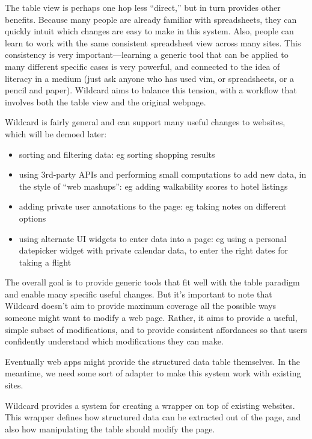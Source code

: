 \documentclass[english,submission]{programming}
\begin{document}
The table view is perhaps one hop less ``direct,'' but in turn provides
other benefits. Because many people are already familiar with
spreadsheets, they can quickly intuit which changes are easy to make in
this system. Also, people can learn to work with the same consistent
spreadsheet view across many sites. This consistency is very
important---learning a generic tool that can be applied to many
different specific cases is very powerful, and connected to the idea of
literacy in a medium (just ask anyone who has used vim, or spreadsheets,
or a pencil and paper). Wildcard aims to balance this tension, with a
workflow that involves both the table view and the original webpage.

Wildcard is fairly general and can support many useful changes to
websites, which will be demoed later:

\begin{itemize}
\tightlist
\item
  sorting and filtering data: eg sorting shopping results
\item
  using 3rd-party APIs and performing small computations to add new
  data, in the style of ``web mashups'': eg adding walkability scores to
  hotel listings
\item
  adding private user annotations to the page: eg taking notes on
  different options
\item
  using alternate UI widgets to enter data into a page: eg using a
  personal datepicker widget with private calendar data, to enter the
  right dates for taking a flight
\end{itemize}

The overall goal is to provide generic tools that fit well with the
table paradigm and enable many specific useful changes. But it's
important to note that Wildcard doesn't aim to provide maximum coverage
all the possible ways someone might want to modify a web page. Rather,
it aims to provide a useful, simple subset of modifications, and to
provide consistent affordances so that users confidently understand
which modifications they can make.

Eventually web apps might provide the structured data table themselves.
In the meantime, we need some sort of adapter to make this system work
with existing sites.

Wildcard provides a system for creating a wrapper on top of existing
websites. This wrapper defines how structured data can be extracted out
of the page, and also how manipulating the table should modify the page.
\end{document}
